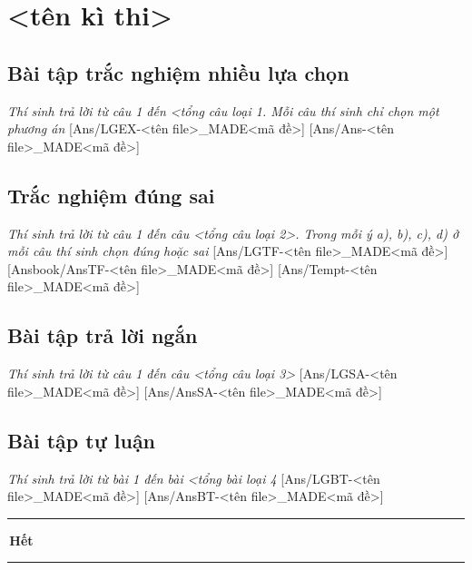 \documentclass[FileMain.tex]{subfiles}
\gdef\made{<mã đề ngẫu nhiên>}  %
\begin{document}
\section[<tên kì thi> <môn thi> - Mã đề \made]{<tên kì thi>} %

\subsection{Bài tập trắc nghiệm nhiều lựa chọn}\textit{\large Thí sinh trả lời từ câu 1 đến <tổng câu loại 1. Mỗi câu thí sinh chỉ chọn một phương án}
[Ans/LGEX-<tên file>_MADE<mã đề>]
[Ans/Ans-<tên file>_MADE<mã đề>]

\subsection{Trắc nghiệm đúng sai}\textit{\large Thí sinh trả lời từ câu 1 đến câu <tổng câu loại 2>. Trong mỗi ý a), b), c), d) ở mỗi câu thí sinh chọn đúng hoặc sai}
[Ans/LGTF-<tên file>_MADE<mã đề>]
[Ansbook/AnsTF-<tên file>_MADE<mã đề>]
[Ans/Tempt-<tên file>_MADE<mã đề>]
\setcounter{ex}{0}

\subsection{Bài tập trả lời ngắn}\textit{\large Thí sinh trả lời từ câu 1 đến câu <tổng câu loại 3>}
[Ans/LGSA-<tên file>_MADE<mã đề>]
[Ans/AnsSA-<tên file>_MADE<mã đề>]
\setcounter{ex}{0}

\subsection{Bài tập tự luận}\textit{\large Thí sinh trả lời từ bài 1 đến bài <tổng bài loại 4}
[Ans/LGBT-<tên file>_MADE<mã đề>]
[Ans/AnsBT-<tên file>_MADE<mã đề>]

\begin{center}
 \rule[4pt]{2cm}{1pt}\,\large\bfseries Hết\,\rule[4pt]{2cm}{1pt}
\end{center}
\label{x}
\end{document}

